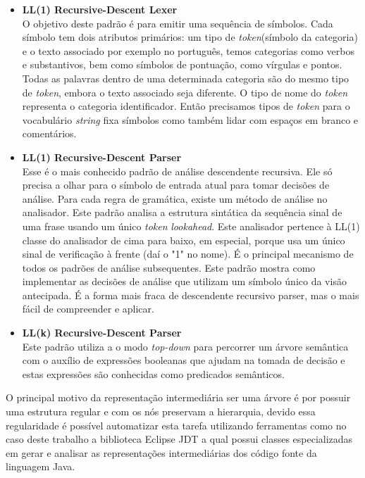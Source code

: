 \begin{itemize}
	\item \textbf{LL(1) Recursive-Descent Lexer}\\
	O objetivo deste padr\~{a}o \'{e} para emitir uma sequência de s\'{i}mbolos. Cada s\'{i}mbolo tem dois atributos prim\'{a}rios: um tipo de \textit{token}(s\'{i}mbolo da categoria) e o texto associado por exemplo 
	no português, temos categorias como verbos e substantivos, bem como s\'{i}mbolos de pontua\c{c}\~{a}o, como v\'{i}rgulas e pontos. Todas as palavras dentro de uma determinada categoria s\~{a}o do mesmo tipo de \textit{token}, embora o texto associado seja diferente. O tipo de nome do \textit{token} representa o categoria identificador. Ent\~{a}o precisamos tipos de \textit{token} para o vocabul\'{a}rio \textit{string} fixa s\'{i}mbolos como tamb\'{e}m lidar com espa\c{c}os em branco e coment\'{a}rios.
	\item \textbf{LL(1) Recursive-Descent Parser}\\
	Esse \'{e} o mais conhecido padr\~{a}o de an\'{a}lise descendente recursiva. Ele s\'{o} precisa	a olhar para o s\'{i}mbolo de entrada atual para tomar decis\~{o}es de an\'{a}lise. Para cada regra de gram\'{a}tica, existe um m\'{e}todo de an\'{a}lise no analisador. Este padr\~{a}o analisa a estrutura sint\'{a}tica da sequência sinal de uma frase usando um \'{u}nico \textit{token} \textit{lookahead}. Este analisador pertence à LL(1) classe do analisador de cima para baixo, em especial, porque usa um \'{u}nico sinal de verifica\c{c}\~{a}o à frente (da\'{i} o "1" no nome). É o principal mecanismo de todos os padr\~{o}es de an\'{a}lise subsequentes. Este padr\~{a}o mostra como implementar as decis\~{o}es de an\'{a}lise que utilizam um s\'{i}mbolo \'{u}nico da vis\~{a}o antecipada. É a forma mais fraca de descendente recursivo parser, mas o mais f\'{a}cil de compreender e aplicar.
	\item \textbf{LL(k) Recursive-Descent Parser}\\
	Este padr\~{a}o utiliza a o modo \textit{top-down} para percorrer um \'{a}rvore sem\^{a}ntica com o aux\'{i}lio de express\~{o}es booleanas que ajudam na tomada de decis\~{a}o e estas express\~{o}es s\~{a}o conhecidas como predicados sem\^{a}nticos.
\end{itemize}


O principal motivo da representa\c{c}\~{a}o intermedi\'{a}ria ser uma \'{a}rvore \'{e} por possuir uma estrutura regular e com os n\'{o}s preservam a hierarquia, devido essa regularidade \'{e} poss\'{i}vel automatizar esta tarefa utilizando ferramentas como no caso deste trabalho a biblioteca Eclipse JDT a qual possui classes especializadas em gerar e analisar as representa\c{c}\~{o}es intermedi\'{a}rias dos c\'{o}digo fonte da linguagem Java.




